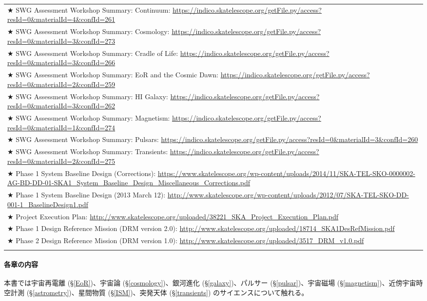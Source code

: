 \begin{table}
\begin{center}
\begin{tabular}{p{}}
\noalign{\smallskip}
★ SWG Assessment Workshop Summary: Continuum: 
\url{https://indico.skatelescope.org/getFile.py/access?resId=0&materialId=4&confId=261}\\
\noalign{\smallskip}
★ SWG Assessment Workshop Summary: Cosmology: 
\url{https://indico.skatelescope.org/getFile.py/access?resId=0&materialId=3&confId=273}\\
\noalign{\smallskip}
★ SWG Assessment Workshop Summary: Cradle of Life: 
\url{https://indico.skatelescope.org/getFile.py/access?resId=0&materialId=3&confId=266}\\
\noalign{\smallskip}
★ SWG Assessment Workshop Summary: EoR and the Cosmic Dawn: 
\url{https://indico.skatelescope.org/getFile.py/access?resId=0&materialId=2&confId=259}\\
\noalign{\smallskip}
★ SWG Assessment Workshop Summary: HI Galaxy: 
\url{https://indico.skatelescope.org/getFile.py/access?resId=0&materialId=3&confId=262}\\
\noalign{\smallskip}
★ SWG Assessment Workshop Summary: Magnetism: 
\url{https://indico.skatelescope.org/getFile.py/access?resId=0&materialId=1&confId=274}\\
\noalign{\smallskip}
★ SWG Assessment Workshop Summary: Pulsars: 
\url{https://indico.skatelescope.org/getFile.py/access?resId=0&materialId=3&confId=260}\\
\noalign{\smallskip}
★ SWG Assessment Workshop Summary: Transients: 
\url{https://indico.skatelescope.org/getFile.py/access?resId=0&materialId=2&confId=275}\\
\noalign{\smallskip}
★ Phase 1 System Baseline Design (Corrections): 
\url{https://www.skatelescope.org/wp-content/uploads/2014/11/SKA-TEL-SKO-0000002-AG-BD-DD-01-SKA1_System_Baseline_Design_Miscellaneous_Corrections.pdf}\\
\noalign{\smallskip}
★ Phase 1 System Baseline Design (2013 March 12): 
\url{http://www.skatelescope.org/wp-content/uploads/2012/07/SKA-TEL-SKO-DD-001-1_BaselineDesign1.pdf}\\
\noalign{\smallskip}
★ Project Execution Plan: 
\url{http://www.skatelescope.org/uploaded/38221_SKA_Project_Execution_Plan.pdf}\\
\noalign{\smallskip}
★ Phase 1 Design Reference Mission (DRM version 2.0): 
\url{http://www.skatelescope.org/uploaded/18714_SKA1DesRefMission.pdf}\\
\noalign{\smallskip}
★ Phase 2 Design Reference Mission (DRM version 1.0): 
\url{http://www.skatelescope.org/uploaded/3517_DRM_v1.0.pdf}\\
\noalign{\smallskip}
\hline
\end{tabular}\label{c01.s3.t1}
\end{center}
\end{table}

\paragraph{各章の内容}

本書では宇宙再電離 (\S \ref{EoR})、宇宙論 (\S \ref{cosmology})、銀河進化 (\S \ref{galaxy})、パルサー (\S \ref{pulsar})、宇宙磁場 (\S \ref{magnetism})、近傍宇宙時空計測 (\S \ref{astrometry})、星間物質 (\S \ref{ISM})、突発天体 (\S \ref{transients}) のサイエンスについて触れる。

